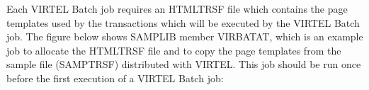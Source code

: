 \documentclass[letterpaper,10pt,english]{sphinxmanual}
\begin{document}
Each VIRTEL Batch job requires an HTMLTRSF file which contains the page templates used by the transactions which
will be executed by the VIRTEL Batch job. The figure below shows SAMPLIB member VIRBATAT, which is an example job
to allocate the HTMLTRSF file and to copy the page templates from the sample file (SAMPTRSF) distributed with
VIRTEL. This job should be run once before the first execution of a VIRTEL Batch job:

\begin{sphinxVerbatim}[commandchars=\\\{\}]
  
     

\end{sphinxVerbatim}
\end{document}
